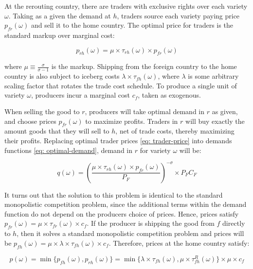 At the rerouting country, there are traders with exclusive rights over each variety $\omega$. Taking as a given the demand at $h$, traders source each variety paying price $p_{fr}(\omega)$ and sell it to the home country. The optimal price for traders is the standard markup over marginal cost:

\begin{equation}\label{eq: trader-price}
    p_{rh}(\omega) = \mu \times \tau_{rh}(\omega) \times p_{fr}(\omega)
\end{equation}

\noindent where $\mu \equiv \frac{\sigma}{\sigma-1}$ is the markup. Shipping from the foreign country to the home country is also subject to iceberg costs $\lambda \times \tau_{fh}(\omega)$, where $\lambda$ is some arbitrary scaling factor that rotates the trade cost schedule. To produce a single unit of variety $\omega$, producers incur a marginal cost $c_f$, taken as exogenous. 

When selling the good to $r$, producers will take optimal demand in $r$ as given, and choose prices $p_{fr}(\omega)$ to maximize profits. Traders in $r$ will buy exactly the amount goods that they will sell to $h$, net of trade costs, thereby maximizing their profits. Replacing  optimal trader prices \eqref{eq: trader-price} into demands functions \eqref{eq: optimal-demand}, demand in $r$ for variety $\omega$ will be:

\begin{equation*}
    q(\omega) = \left( \frac{\mu \times \tau_{rh}(\omega) \times p_{fr}(\omega)}{P_F} \right)^{-\sigma} \times P_F C_F
\end{equation*}

It turns out that the solution to this problem is identical to the standard monopolistic competition problem, since the additional terms within the demand function do not depend on the producers choice of prices. Hence, prices satisfy $p_{fr}(\omega) = \mu \times \tau_{fr}(\omega) \times c_f$. If the producer is shipping the good from $f$ directly to $h$, then it solves a standard monopolistic competition problem and prices will be $p_{fh}(\omega) = \mu \times \lambda \times \tau_{fh}(\omega) \times c_f$. Therefore, prices at the home country satisfy:

\begin{equation}\label{eq: home-price}
    p(\omega)  = \min \{ p_{fh}(\omega) , p_{rh}(\omega) \} = \min \{  \lambda \times \tau_{fh}(\omega),  \mu \times \tau^R_{fh}(\omega) \}  \times\mu  \times c_f
\end{equation}

